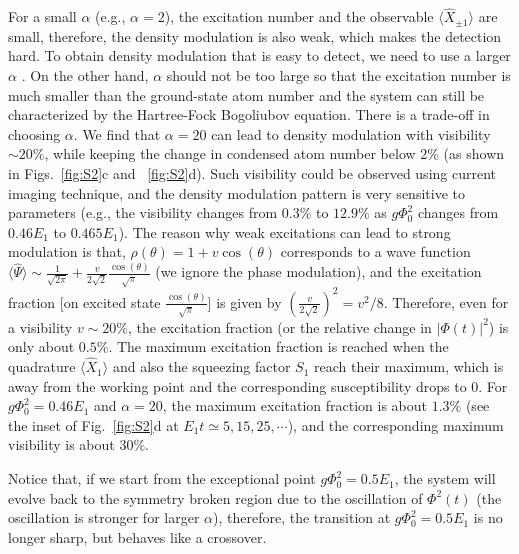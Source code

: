 \documentclass[twocolumn,prl,floatfix,citeautoscript,nofootinbib,superscriptaddress]{revtex4}
\begin{document}
\begin{widetext}
For a small $\alpha $ (e.g., $\alpha =2$), the excitation number and the
observable $\langle \hat{X}_{\pm 1}\rangle $ are small, therefore, the
density modulation is also weak, which makes the detection hard. To obtain
density modulation that is easy to detect, we need to use a larger $\alpha $%
. On the other hand, $\alpha $ should not be too large so that the
excitation number is much smaller than the ground-state atom number and the
system can still be characterized by the Hartree-Fock Bogoliubov equation.
There is a trade-off in choosing $\alpha $. We find that $\alpha =20$ can
lead to density modulation with visibility $\sim 20\%$, while keeping the
change in condensed atom number below $2\%$ (as shown in Figs.~\ref{fig:S2}c
and ~\ref{fig:S2}d). Such visibility could be observed using current imaging
technique, and the density modulation pattern is very sensitive to
parameters (e.g., the visibility changes from $0.3\%$ to $12.9\%$ as $g\Phi
_{0}^{2}$ changes from $0.46E_{1}$ to $0.465E_{1}$). The reason why weak
excitations can lead to strong modulation is that, $\rho (\theta )=1+v\cos
(\theta )$ corresponds to a wave function $\langle \hat{\Psi}\rangle \sim
\frac{1}{\sqrt{2\pi }}+\frac{v}{2\sqrt{2}}\frac{\cos (\theta )}{\sqrt{\pi }}$
(we ignore the phase modulation), and the excitation fraction [on excited
state $\frac{\cos (\theta )}{\sqrt{\pi }}$] is given by $(\frac{v}{2\sqrt{2}}%
)^{2}=v^{2}/8$. Therefore, even for a visibility $v\sim 20\%$, the
excitation fraction (or the relative change in $|\Phi (t)|^{2}$) is only
about $0.5\%$. The maximum excitation fraction is reached when the
quadrature $\langle \hat{X}_{1}\rangle $ and also the squeezing factor $%
S_{1} $ reach their maximum, which is away from the working point and the
corresponding susceptibility drops to 0. For $g\Phi _{0}^{2}=0.46E_{1}$ and $%
\alpha =20$, the maximum excitation fraction is about $1.3\%$ (see the inset
of Fig.~\ref{fig:S2}d at $E_{1}t\simeq 5,15,25,\cdots $), and the
corresponding maximum visibility is about $30\%$.

Notice that, if we start from the exceptional point $g\Phi_0^2=0.5E_1$, the
system will evolve back to the symmetry broken region due to the oscillation
of $\Phi^2(t)$ (the oscillation is stronger for larger $\alpha$), therefore,
the transition at $g\Phi_0^2=0.5E_1$ is no longer sharp, but behaves like a
crossover.


\end{widetext}
\end{document}
